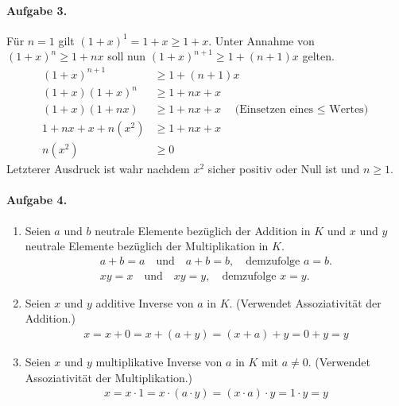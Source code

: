 \documentclass{article}
\begin{document}
\paragraph{Aufgabe 3.} Für $n = 1$ gilt $(1 + x)^1 = 1 + x \geq 1 + x$. Unter Annahme von $(1+x)^n \geq 1 + nx$ soll nun $(1+x)^{n + 1} \geq 1 + (n + 1)x$ gelten.
\begin{align*}
    (1+x)^{n + 1} &\geq 1 + (n + 1)x \\
    (1+x)(1+x)^{n} &\geq 1 + nx + x \\
    (1+x)(1 + nx) &\geq 1 + nx + x \quad\text{(Einsetzen eines $\leq$ Wertes)}\\
    1 + nx + x + n(x^2) &\geq 1 + nx + x \\
    n(x^2) &\geq 0
\end{align*}
Letzterer Ausdruck ist wahr nachdem $x^2$ sicher positiv oder Null ist und $n \geq 1$.

\paragraph{Aufgabe 4.}
\begin{enumerate}
    \item Seien $a$ und $b$ neutrale Elemente bezüglich der Addition in $K$ und $x$ und $y$ neutrale Elemente bezüglich der Multiplikation in $K$.
    \begin{align*}
        a + b = a \quad\text{und}\quad a + b = b, \quad\text{demzufolge $a = b$.} \\
        xy = x \quad\text{und}\quad xy = y, \quad\text{demzufolge $x = y$.}
    \end{align*}
    \item Seien $x$ und $y$ additive Inverse von $a$ in $K$. (Verwendet Assoziativität der Addition.)
    \begin{align*}
        x = x + 0 = x + (a + y) = (x + a) + y = 0 + y = y
    \end{align*}
    \item Seien $x$ und $y$ multiplikative Inverse von $a$ in $K$ mit $a \neq 0$. (Verwendet Assoziativität der Multiplikation.)
    \begin{align*}
        x = x \cdot 1 = x \cdot (a \cdot y) = (x \cdot a) \cdot y = 1 \cdot y = y
    \end{align*}
\end{enumerate}
\end{document}
